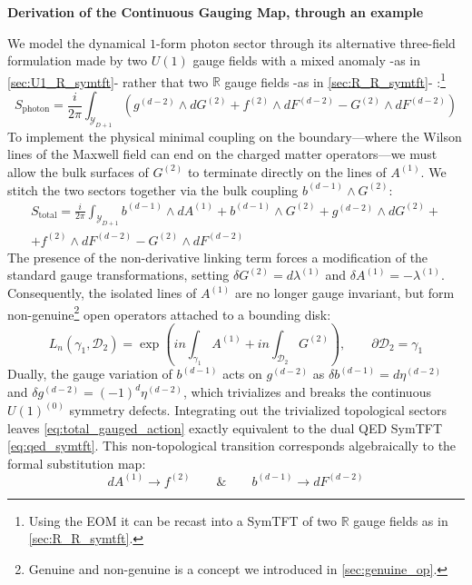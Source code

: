 \documentclass[aps,preprint,nofootinbib,preprintnumbers,eqsecnum,superscriptaddress]{revtex4}
\numberwithin{equation}{section}
\begin{document}
\begin{tcolorbox}
{\bf Derivation of the Continuous Gauging Map, through an example}

We model the dynamical $1$-form photon sector through its alternative three-field formulation made by two $U(1)$ gauge fields with a mixed anomaly -as in \ref{sec:U1_R_symtft}- rather that two $\mathbb{R}$ gauge fields -as in \ref{sec:R_R_symtft}- \cite{Antinucci_2025, Antinucci:2024bny}:\footnote{Using the EOM it can be recast into a SymTFT of two $\mathbb{R}$ gauge fields as in \ref{sec:R_R_symtft}.}
\begin{equation}\label{eq:maxwell_sytft_u1}
    S_{\text{photon}} = \frac{i}{2\pi} \int_{\mathcal{Y}_{D+1}} \left( g^{(d-2)} \wedge dG^{(2)} + f^{(2)} \wedge dF^{(d-2)} - G^{(2)} \wedge dF^{(d-2)} \right)
\end{equation}
To implement the physical minimal coupling on the boundary—where the Wilson lines of the Maxwell field can end on the charged matter operators—we must allow the bulk surfaces of $G^{(2)}$ to terminate directly on the lines of $A^{(1)}$. We stitch the two sectors together via the bulk coupling $b^{(d-1)} \wedge G^{(2)}$:
\begin{multline}
\label{eq:total_gauged_action}
    S_{\text{total}} = \frac{i}{2\pi} \int_{\mathcal{Y}_{D+1}}  b^{(d-1)} \wedge dA^{(1)} + b^{(d-1)} \wedge G^{(2)} + g^{(d-2)} \wedge dG^{(2)} + \\ 
    + f^{(2)} \wedge dF^{(d-2)} - G^{(2)} \wedge dF^{(d-2)} 
\end{multline}
The presence of the non-derivative linking term forces a modification of the standard gauge transformations, setting $\delta G^{(2)} = d\lambda^{(1)}$ and $\delta A^{(1)} = -\lambda^{(1)}$. Consequently, the isolated lines of $A^{(1)}$ are no longer gauge invariant, but form non-genuine\footnote{Genuine and non-genuine is a concept we introduced in \ref{sec:genuine_op}.} open operators attached to a bounding disk:
\begin{equation}
    L_n(\gamma_1, \mathcal{D}_2) = \exp \left( in\int_{\gamma_1} A^{(1)} + in\int_{\mathcal{D}_2} G^{(2)} \right), \qquad \partial\mathcal{D}_2 = \gamma_1
\end{equation}
Dually, the gauge variation of $b^{(d-1)}$ acts on $g^{(d-2)}$ as $\delta b^{(d-1)} = d\eta^{(d-2)}$ and $\delta g^{(d-2)} = (-1)^{d}\eta^{(d-2)}$, which trivializes and breaks the continuous $U(1)^{(0)}$ symmetry defects. Integrating out the trivialized topological sectors leaves \eqref{eq:total_gauged_action} exactly equivalent to the dual QED SymTFT \eqref{eq:qed_symtft}. This non-topological transition corresponds algebraically to the formal substitution map:
\begin{equation}\label{eq:symtft_gauging_map}
    dA^{(1)} \longrightarrow f^{(2)} \qquad \& \qquad b^{(d-1)} \longrightarrow dF^{(d-2)}
\end{equation}
\end{tcolorbox}
\end{document}
